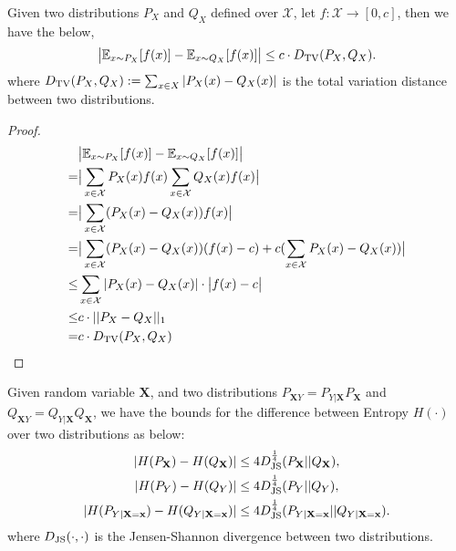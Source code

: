 \begin{lemma}\label{thm:tv_based_bound}
    Given two distributions $P_{X}$ and $Q_{X}$ defined over $\mathcal{X}$, let $f:\mathcal{X}\rightarrow [0,c]$, then we have the below,
\begin{equation*}
   \big | \mathbb{E}_{x\sim P_{X}}[f(x)] - \mathbb{E}_{x\sim Q_{X}}[f(x)] \big | \leq c \cdot D_{\rm TV}(P_{X},Q_{X}).
\end{equation*}
where $D_{\rm TV}(P_{X},Q_{X}):=\sum_{x\in X}|P_{X}(x) - Q_{X}(x)|$ is the total variation distance between two distributions.
\end{lemma}
\begin{proof}
\begin{align*}
&\big | \mathbb{E}_{x\sim P_{X}}[f(x)] - \mathbb{E}_{x\sim Q_{X}}[f(x)] \big | \\
=&\big | \sum_{x\in\mathcal{X}} P_{X}(x)f(x) \sum_{x\in\mathcal{X}} Q_{X}(x)f(x) \big | \\
=&\big | \sum_{x\in\mathcal{X}} (P_{X}(x) - Q_{X}(x))f(x) \big | \\
=&\big | \sum_{x\in\mathcal{X}} (P_{X}(x) - Q_{X}(x))(f(x) - c) + c(\sum_{x\in\mathcal{X}} P_{X}(x)-Q_{X}(x))  \big | \\
\leq & \sum_{x\in\mathcal{X}} | P_{X}(x) - Q_{X}(x)| \cdot \big | f(x) - c \big | \\
\leq & c \cdot ||P_{X}-Q_{X}||_{1} \\
=& c \cdot D_{\rm TV}(P_{X},Q_{X}) 
\end{align*}
\end{proof}

\begin{lemma}\label{thm:entropy_diff_bound}
    Given random variable $\mathbf{X}$, and two distributions $P_{\mathbf{X}Y}=P_{Y|\mathbf{X}}P_{\mathbf{X}}$ and $Q_{\mathbf{X}Y}=Q_{Y|\mathbf{X}}Q_{\mathbf{X}}$, we have the bounds for the difference between Entropy $H(\cdot)$ over two distributions as below:
\begin{equation*}
\begin{split}
   |H(P_{\mathbf{X}}) - H(Q_{\mathbf{X}})| &\leq 4 D^{\frac{1}{4}}_{\rm JS}(P_{\mathbf{X}}|| Q_{\mathbf{X}}), \\ 
   |H(P_{Y}) - H(Q_{Y})| &\leq 4 D^{\frac{1}{4}}_{\rm JS}(P_{Y}|| Q_{Y}), \\  
   | H(P_{Y|\mathbf{X}=\mathbf{x}}) - H(Q_{Y|\mathbf{X}=\mathbf{x}}) | & \leq 4 D^{\frac{1}{4}}_{\rm JS}(P_{Y|\mathbf{X}=\mathbf{x}}|| Q_{Y|\mathbf{X}=\mathbf{x}}).
\end{split}
\end{equation*}
where $D_{\rm JS}(\cdot,\cdot)$ is the Jensen-Shannon divergence between two distributions.
\end{lemma}


